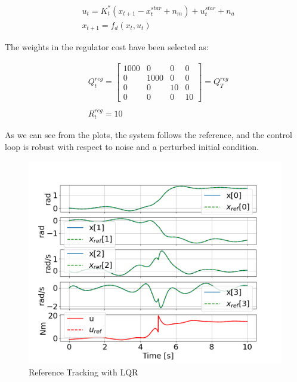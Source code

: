 \begin{equation}
    \begin{aligned}
        &{u}_t = {K}_t^*(x_{t+1} - x_t^{star} + n_m) + u_t^{star} + n_a\\
        &{x}_{t+1} = f_d(x_t,u_t)
    \end{aligned}
\end{equation}

The weights in the regulator cost have been selected as:

\begin{equation*}
    \begin{aligned}
        &Q_t^{reg} = \begin{bmatrix}
            1000 & 0 & 0 & 0 \\
            0 & 1000 & 0 & 0 \\
            0 & 0 & 10 & 0\\
            0 & 0 & 0 & 10
        \end{bmatrix} = Q_T^{reg}\\
        &\\
    & R^{reg}_t = 10
    \end{aligned}
\end{equation*}

As we can see from the plots, the system follows the reference, and the control loop is robust with respect to noise and a perturbed initial condition.

\begin{figure}
    \centering
    \includegraphics[width=0.8\linewidth]{figs/downward_lqr_track.png}
    \caption{Reference Tracking with LQR}
    \label{fig:downward_lqr_track}
\end{figure}

